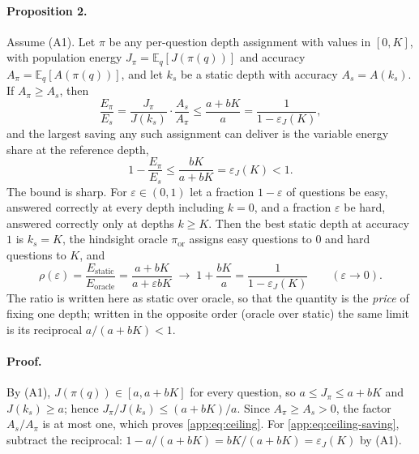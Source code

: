\paragraph{Proposition 2.} Assume (A1). Let $\pi$ be any per-question depth
assignment with values in $[0,K]$, with population energy
$J_{\pi}=\mathbb{E}_{q}[J(\pi(q))]$ and accuracy
$A_{\pi}=\mathbb{E}_{q}[A(\pi(q))]$, and let $k_{s}$ be a static depth with
accuracy $A_{s}=A(k_{s})$. If $A_{\pi}\ge A_{s}$, then
\begin{equation}\label{app:eq:ceiling}
  \frac{E_{\pi}}{E_{s}}
  =\frac{J_{\pi}}{J(k_{s})}\cdot\frac{A_{s}}{A_{\pi}}
  \le\frac{a+bK}{a}
  =\frac{1}{1-\varepsilon_{J}(K)} ,
\end{equation}
and the largest saving any such assignment can deliver is the variable energy
share at the reference depth,
\begin{equation}\label{app:eq:ceiling-saving}
  1-\frac{E_{\pi}}{E_{s}}\le\frac{bK}{a+bK}=\varepsilon_{J}(K)<1 .
\end{equation}
The bound is sharp. For $\varepsilon\in(0,1)$ let a fraction $1-\varepsilon$ of
questions be easy, answered correctly at every depth including $k=0$, and a
fraction $\varepsilon$ be hard, answered correctly only at depths $k\ge K$. Then
the best static depth at accuracy $1$ is $k_{s}=K$, the hindsight oracle
$\pi_{\mathrm{or}}$ assigns easy questions to $0$ and hard questions to $K$, and
\begin{equation}\label{app:eq:rho}
  \rho(\varepsilon)
  =\frac{E_{\mathrm{static}}}{E_{\mathrm{oracle}}}
  =\frac{a+bK}{a+\varepsilon bK}
  \;\longrightarrow\;
  1+\frac{bK}{a}
  =\frac{1}{1-\varepsilon_{J}(K)}
  \qquad(\varepsilon\to0).
\end{equation}
The ratio is written here as static over oracle, so that the quantity is the
\emph{price} of fixing one depth; written in the opposite order (oracle over
static) the same limit is its reciprocal $a/(a+bK)<1$.

\paragraph{Proof.} By (A1), $J(\pi(q))\in[a,a+bK]$ for every question, so
$a\le J_{\pi}\le a+bK$ and $J(k_{s})\ge a$; hence
$J_{\pi}/J(k_{s})\le(a+bK)/a$. Since $A_{\pi}\ge A_{s}>0$, the factor
$A_{s}/A_{\pi}$ is at most one, which proves \eqref{app:eq:ceiling}. For
\eqref{app:eq:ceiling-saving}, subtract the reciprocal:
$1-a/(a+bK)=bK/(a+bK)=\varepsilon_{J}(K)$ by (A1).

